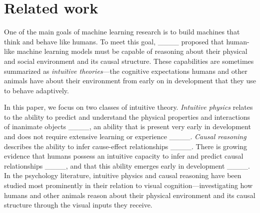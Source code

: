 \section{Related work}
One of the main goals of machine learning research is to build machines that think and behave like humans. To meet this goal, ____ proposed that human-like machine learning models must be capable of reasoning about their physical and social environment and its causal structure. These capabilities are sometimes summarized as \textit{intuitive theories}---the cognitive expectations humans and other animals have about their environment from early on in development that they use to behave adaptively.

In this paper, we focus on two classes of intuitive theory. \textit{Intuitive physics} relates to the ability to predict and understand the physical properties and interactions of inanimate objects ____, an ability that is present very early in development and does not require extensive learning or experience ____. \textit{Causal reasoning} describes the ability to infer cause-effect relationships ____. There is growing evidence that humans possess an intuitive capacity to infer and predict causal relationships ____, and that this ability emerges early in development ____. In the psychology literature, intuitive physics and causal reasoning have been studied most prominently in their relation to visual cognition---investigating how humans and other animals reason about their physical environment and its causal structure through the visual inputs they receive.

